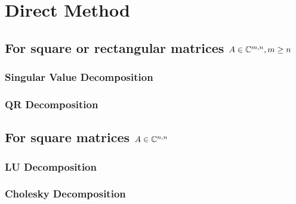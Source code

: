 \documentclass[12pt]  {article}%
\begin{document}
\section{Direct Method}
\subsection{For square or rectangular matrices $A\in\mathbb{C}^{m,n}, m\geq n$}

\subsubsection{Singular Value Decomposition}


\subsubsection{QR Decomposition}




\subsection{For square matrices $A\in\mathbb{C}^{n,n}$}

\subsubsection{LU Decomposition}

\subsubsection{Cholesky Decomposition}
\end{document}
